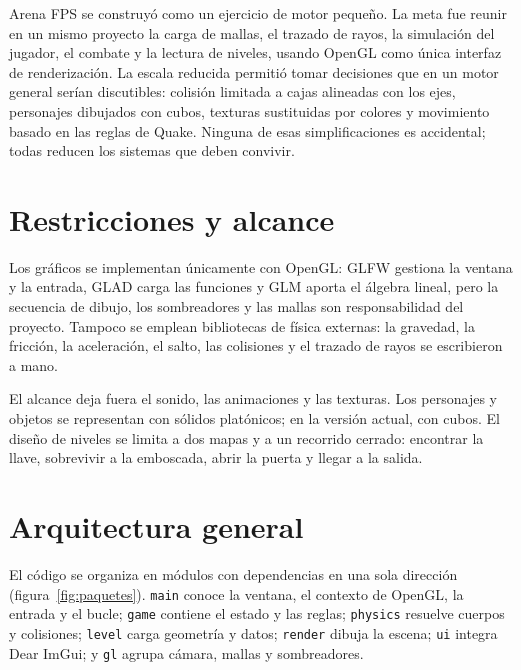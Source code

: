 \documentclass[12pt,a4paper]{article}
\begin{document}
Arena FPS se construyó como un ejercicio de motor pequeño. La meta fue reunir en
un mismo proyecto la carga de mallas, el trazado de rayos, la simulación del
jugador, el combate y la lectura de niveles, usando OpenGL como única interfaz de
renderización. La escala reducida permitió tomar decisiones que en un motor
general serían discutibles: colisión limitada a cajas alineadas con los ejes,
personajes dibujados con cubos, texturas sustituidas por colores y movimiento
basado en las reglas de Quake. Ninguna de esas simplificaciones es accidental;
todas reducen los sistemas que deben convivir.
\section{Restricciones y alcance}

Los gráficos se implementan únicamente con OpenGL: GLFW gestiona la ventana y la
entrada, GLAD carga las funciones y GLM aporta el álgebra lineal, pero la
secuencia de dibujo, los sombreadores y las mallas son responsabilidad del
proyecto. Tampoco se emplean bibliotecas de física externas: la gravedad, la
fricción, la aceleración, el salto, las colisiones y el trazado de rayos se
escribieron a mano.

El alcance deja fuera el sonido, las animaciones y las texturas. Los personajes
y objetos se representan con sólidos platónicos; en la versión actual, con
cubos. El
diseño de niveles se limita a dos mapas y a un recorrido cerrado: encontrar la
llave, sobrevivir a la emboscada, abrir la puerta y llegar a la salida.

\section{Arquitectura general}

El código se organiza en módulos con dependencias en una sola dirección
(figura~\ref{fig:paquetes}). \texttt{main} conoce la ventana, el contexto de
OpenGL, la entrada y el bucle; \texttt{game} contiene el estado y las reglas;
\texttt{physics} resuelve cuerpos y colisiones; \texttt{level} carga geometría y
datos; \texttt{render} dibuja la escena; \texttt{ui} integra Dear ImGui; y
\texttt{gl} agrupa cámara, mallas y sombreadores.
\end{document}
